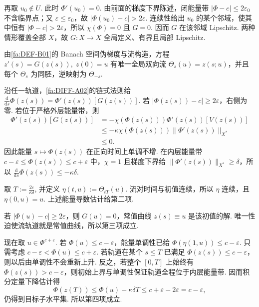 \begin{FAProof}
再取 \(\displaystyle u_0\notin U\). 此时 \(\displaystyle\Phi'(u_0)=0\). 由前面的梯度下界陈述，闭能量带 \(\displaystyle|\Phi-c|\leqslant2\varepsilon_0\) 不含临界点；又 \(\displaystyle\varepsilon\leqslant\varepsilon_0\)，故 \(\displaystyle|\Phi(u_0)-c|>2\varepsilon\). 连续性给出 \(\displaystyle u_0\) 的某个邻域，使其中恒有 \(\displaystyle|\Phi-c|>2\varepsilon\)，所以 \(\displaystyle\chi(\Phi)=0\) 且 \(\displaystyle G=0\). 因而 \(\displaystyle G\) 在该邻域 Lipschitz. 两种情形覆盖全部 \(\displaystyle X\)，故 \(\displaystyle G:X\to X\) 全局定义、有界且局部 Lipschitz.

由\autoref{fa:DEF-B01}的 Banach 空间伪梯度与流构造，方程
\(\displaystyle z'(s)=G(z(s)), \; z(0)=u\)
有唯一全局双向流 \(\displaystyle\Theta_s(u)=z(s;u)\)，并且每个 \(\displaystyle\Theta_s\) 为同胚，逆映射为 \(\displaystyle\Theta_{-s}\).

沿任一轨道，\autoref{fa:DIFF-A02}的链式法则给
\(\displaystyle \frac{\mathrm{d}}{\mathrm{d}s}\Phi(z(s)) = \Phi'(z(s))[G(z(s))]\).
若 \(\displaystyle|\Phi(z(s))-c|\geqslant2\varepsilon\)，右侧为零. 若位于严格外层能量带，则
\[
\begin{aligned}
\displaystyle \Phi'(z(s))[G(z(s))]
&=-\displaystyle \chi(\Phi(z(s)))\Phi'(z(s))[V(z(s))]\\
&\leqslant\displaystyle
-\kappa\chi(\Phi(z(s)))\|\Phi'(z(s))\|_{X^*}\\
&\leqslant\displaystyle 0.
\end{aligned}
\]
因此能量 \(\displaystyle s\mapsto\Phi(z(s))\) 在正向时间上单调不增. 在内层能量带 \(\displaystyle c-\varepsilon\leqslant\Phi(z(s))\leqslant c+\varepsilon\) 中，\(\displaystyle\chi=1\) 且梯度下界给 \(\displaystyle\|\Phi'(z(s))\|_{X^*}\geqslant\delta\)，所以
\(\displaystyle \frac{\mathrm{d}}{\mathrm{d}s}\Phi(z(s)) \leqslant -\kappa\delta\).

取
\(\displaystyle T:=\frac{2\varepsilon}{\kappa\delta}\),
并定义
\(\displaystyle \eta(t,u):=\Theta_{tT}(u)\).
流对时间与初值连续，所以 \(\displaystyle\eta\) 连续，且 \(\displaystyle\eta(0,u)=u\). 上述能量导数估计给第二项.

若 \(\displaystyle|\Phi(u)-c|\geqslant2\varepsilon\)，则 \(\displaystyle G(u)=0\)，常值曲线 \(\displaystyle z(s)\equiv u\) 是该初值的解. 唯一性迫使流轨道就是常值曲线，所以第三项成立.

现在取 \(\displaystyle u\in\Phi^{c+\varepsilon}\). 若 \(\displaystyle\Phi(u)\leqslant c-\varepsilon\)，能量单调性已给 \(\displaystyle\Phi(\eta(1,u))\leqslant c-\varepsilon\). 只需考虑
\(\displaystyle c-\varepsilon < \Phi(u) \leqslant c+\varepsilon\).
若轨道在某个 \(\displaystyle s\leqslant T\) 已满足 \(\displaystyle\Phi(z(s))\leqslant c-\varepsilon\)，则以后由单调性不会重新上升. 反之，若整个 \(\displaystyle[0,T]\) 上始终有 \(\displaystyle\Phi(z(s))>c-\varepsilon\)，则初始上界与单调性保证轨道全程位于内层能量带. 因而积分定量下降估计得
\[
\Phi(z(T))
\leqslant
\Phi(u)-\kappa\delta T
\leqslant
c+\varepsilon-2\varepsilon
=
c-\varepsilon,
\]
仍得到目标子水平集. 所以第四项成立.


\end{FAProof}

